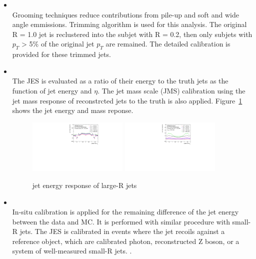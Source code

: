 \begin{itemize}
    \item \textbf{} \\
    Grooming techniques reduce contributions from pile-up and soft and wide angle emmissions. Trimming algorithm \cite{Krohn2010} is used for this analysis. The original R = 1.0 jet is reclustered into the subjet with R = 0.2, then only subjets with $p_T$ > 5\% of the original jet $p_T$ are remained.
    The detailed calibration is provided for these trimmed jets.
    \item \textbf{}\\
    The JES is evaluated as a ratio of their energy to the truth jets as the function of jet energy and $\eta$. The jet mass scale (JMS)  calibration using the jet mass response of reconstrcted jets to the truth is also applied.
    Figure~\ref{fig:largeRresponse} shows the jet energy and mass reponse. 
    \begin{figure}[tbp]
    \begin{center}
    \includegraphics[width=0.45\textwidth,keepaspectratio]{figures/Reconstruction/responsept}
    \includegraphics[width=0.45\textwidth,keepaspectratio]{figures/Reconstruction/responsemass}
    \caption{
    jet energy response of large-R jets \cite{JETM-2018-02}
    }
    \label{fig:largeRresponse}
    \end{center}
    \end{figure} 
    \item  \textbf{} \\
    In-situ calibration is applied for the remaining difference of the jet energy between the data and MC. It is performed with similar procedure with small-R jets. The JES is calibrated in events where the jet recoils against a reference object, which are calibrated photon, reconstructed Z boson, or a system of well-measured small-R jets. \cite{JETM-2018-02}. 
\end{itemize}

